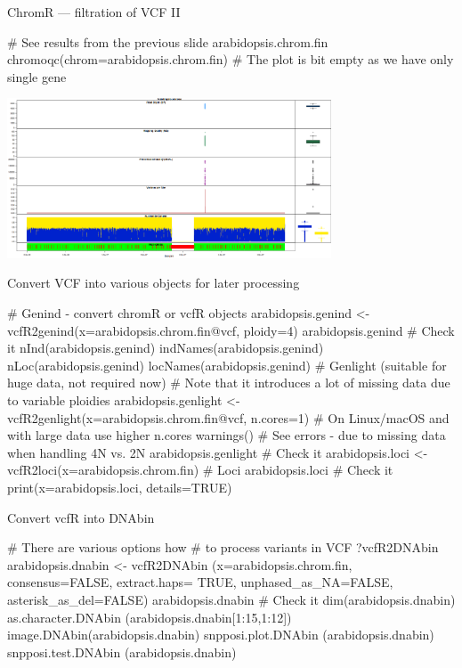 \documentclass[compress, ucs, xelatex, 11pt, xcolor=svgnames, aspectratio=169,
	hyperref={
		bookmarks=true,
		unicode=true,
		colorlinks=true,
		pdftitle={Molecular data in R},
		plainpages=false,
		pdfauthor={Vojtech Zeisek},
		pdfsubject={Course about phylogeny and evolution in R},
		pdfcreator={XeLaTeX},
		pdfkeywords={R, evolution, phylogeny, molecular data},
		linkcolor=Crimson, %
		anchorcolor=Magenta, %
		citecolor=Magenta, %
		filecolor=Magenta, %
		menucolor=Magenta, %
		urlcolor=DodgerBlue, %
		pdftex},
	url={hyphens, lowtilde} %
	]{beamer}
\renewcommand{\texttt}[1]{\colorbox{Beige}{{\ttfamily #1}}}
\begin{document}
\begin{frame}[fragile]{ChromR --- filtration of VCF II}
	\begin{spluscode}
    # See results from the previous slide
    arabidopsis.chrom.fin
    chromoqc(chrom=arabidopsis.chrom.fin)
    # The plot is bit empty as we have only single gene
	\end{spluscode}
	\begin{center}
		\includegraphics[height=4.75cm]{chrom.png}
	\end{center}
\end{frame}

\begin{frame}[fragile]{Convert VCF into various objects for later processing}
	\begin{spluscode}
    # Genind - convert chromR or vcfR objects
    arabidopsis.genind <- vcfR2genind(x=arabidopsis.chrom.fin@vcf, ploidy=4)
    arabidopsis.genind # Check it
    nInd(arabidopsis.genind)
    indNames(arabidopsis.genind)
    nLoc(arabidopsis.genind)
    locNames(arabidopsis.genind)
    # Genlight (suitable for huge data, not required now)
    # Note that it introduces a lot of missing data due to variable ploidies
    arabidopsis.genlight <- vcfR2genlight(x=arabidopsis.chrom.fin@vcf,
      n.cores=1) # On Linux/macOS and with large data use higher n.cores
    warnings() # See errors - due to missing data when handling 4N vs. 2N
    arabidopsis.genlight # Check it
    arabidopsis.loci <- vcfR2loci(x=arabidopsis.chrom.fin) # Loci
    arabidopsis.loci # Check it
    print(x=arabidopsis.loci, details=TRUE)
	\end{spluscode}
\end{frame}

\begin{frame}[fragile]{Convert vcfR into DNAbin}
	\begin{multicols}{2}
	\begin{spluscode}
    # There are various options how
    # to process variants in VCF
    ?vcfR2DNAbin
    arabidopsis.dnabin <- vcfR2DNAbin
      (x=arabidopsis.chrom.fin,
      consensus=FALSE, extract.haps=
      TRUE, unphased_as_NA=FALSE,
      asterisk_as_del=FALSE)
    arabidopsis.dnabin # Check it
    dim(arabidopsis.dnabin)
    as.character.DNAbin
      (arabidopsis.dnabin[1:15,1:12])
    image.DNAbin(arabidopsis.dnabin)
    snpposi.plot.DNAbin
      (arabidopsis.dnabin)
    snpposi.test.DNAbin
      (arabidopsis.dnabin)
	\end{spluscode}
	\begin{center}
		\texttt{[image: vcf\_dna.png]}
	\end{center}
	\end{multicols}
\end{frame}
\end{document}
